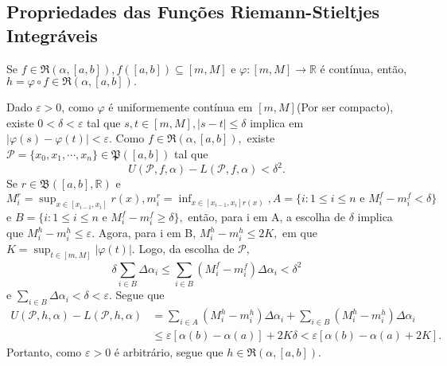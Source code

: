 \documentclass[analysis_notes.tex]{subfiles}
\begin{document}
\subsection{Propriedades das Fun\c cões Riemann-Stieltjes Integráveis}
\begin{theorem*}
	Se \(f\in \mathfrak{R}(\alpha ,[a,b]), f([a, b])\subseteq{[m, M]}\) e \(\varphi :[m, M]\rightarrow \mathbb{R}\) é contínua,
	então, \(h=\varphi\circ{f}\in \mathfrak{R}(\alpha , [a,b]).\)
\end{theorem*}
\begin{proof*}
	Dado \(\varepsilon >0\), como \(\varphi \) é uniformemente contínua em \([m, M]\)(Por ser compacto),
	existe \(0 < \delta  < \varepsilon \) tal que \(s, t\in[m, M], |s-t|\leq \delta \) implica em \(|\varphi (s)-\varphi (t)| < \varepsilon .\)
	Como \(f\in \mathfrak{R}(\alpha , [a, b]),\) existe \(\mathcal{P} = \{x_{0}, x_{1}, \cdots, x_{n}\}\in \mathfrak{P}([a, b])\) tal que
	\[
		U(\mathcal{P}, f, \alpha ) - L(\mathcal{P}, f, \alpha ) < \delta^{2}.
	\]
	Se \(r\in \mathfrak{B}([a, b], \mathbb{R})\) e \(M_{i}^{r} = \sup_{x\in[x_{i-1}, x_{i}]}r(x), m_{i}^{r} = \inf_{x\in[x_{i-1}, x_{i}]r(x)},
	A = \{i: 1\leq i\leq n\text{ e } M_{i}^{f}-m_{i}^{f} < \delta \}\) e \(B = \{i: 1\leq i\leq n\text{ e } M_{i}^{f}-m_{i}^{f}\geq \delta\},\) então,
	para i em A, a escolha de \(\delta \) implica que \(M_{i}^{h} - m_{i}^{h}\leq \varepsilon .\) Agora, para i em B,
	\(M_{i}^{h}-m_{i}^{h}\leq 2K,\) em que \(K=\sup_{t\in[m, M]}|\varphi (t)|\). Logo, da escolha de \(\mathcal{P},\)
	\[
		\delta \sum\limits_{i\in B}^{}\Delta \alpha_{i}\leq \sum\limits_{i\in B}^{}(M_{i}^{f}-m_{i}^{f})\Delta \alpha_{i} < \delta^{2}
	\]
	e \(\sum\limits_{i\in B}^{}\Delta\alpha_{i} < \delta <\varepsilon .\) Segue que
	\begin{align*}
		U(\mathcal{P}, h, \alpha ) - L(\mathcal{P}, h, \alpha ) & = \sum\limits_{i\in A}^{}(M_{i}^{h}-m_{i}^{h})\Delta \alpha_{i} + \sum\limits_{i\in B}^{}(M_{i}^{h}-m_{i}^{h})\Delta\alpha_{i} \\
		                                                        & \leq \varepsilon [\alpha (b)-\alpha (a)]+2K\delta < \varepsilon [\alpha (b)-\alpha (a)+2K].
	\end{align*}
	Portanto, como \(\varepsilon >0\) é arbitrário, segue que \(h\in \mathfrak{R}(\alpha , [a, b]).\)\qedsymbol
\end{proof*}
\end{document}
